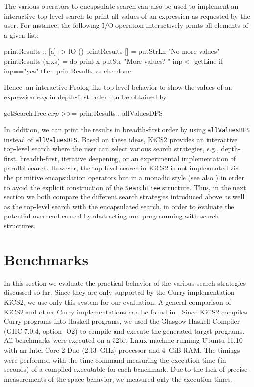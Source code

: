 \documentclass[english]{lni}
\newcommand{\code}[1]{\texttt{\small{}#1}}
\begin{document}
The various operators to encapsulate search can also
be used to implement an interactive top-level search
to print all values of an expression as requested by the user.
For instance, the following I/O operation interactively 
prints all elements of a given list:
%
\begin{curry}
printResults :: [a] -> IO ()
printResults []     = putStrLn "No more values"
printResults (x:xs) = do print x
                         putStr "More values? "
                         inp <- getLine
                         if inp=="yes" then printResults xs
                                       else done
\end{curry}
%
Hence, an interactive Prolog-like top-level behavior
to show the values of an expression $exp$ in depth-first order
can be obtained by
\begin{curry}
getSearchTree $exp$ >>= printResults . allValuesDFS
\end{curry}
In addition, we can print the results in breadth-first order
by using \code{allValuesBFS} instead of \code{allValuesDFS}.
Based on these ideas, KiCS2 provides an interactive top-level search
where the user can select various search strategies,
e.g., depth-first, breadth-first, iterative deepening, or
an experimental implementation of parallel search.
However, the top-level search in KiCS2 is not implemented
via the primitive encapsulation operators but in
a monadic style (see also \cite{BrasselHanusPeemoellerReck11})
in order to avoid the explicit construction
of the \code{SearchTree} structure.
Thus, in the next section we both compare the different search strategies
introduced above as well as the top-level search
with the encapsulated search, in order to evaluate the potential overhead
caused by abstracting and programming with search structures.


\section{Benchmarks}
\label{sec:benchmarks}

In this section we evaluate the practical behavior
of the various search strategies discussed so far.
Since they are only supported by the Curry implementation KiCS2,
we use only this system for our evaluation.
A general comparison of KiCS2 and other Curry implementations
can be found in \cite{BrasselHanusPeemoellerReck11}.
Since KiCS2 compiles Curry programs into Haskell programs,
we used the Glasgow Haskell Compiler
(GHC 7.0.4, option -O2) to compile and execute
the generated target programs.
All benchmarks were executed on a 32bit Linux machine
running Ubuntu 11.10 with an Intel Core 2 Duo (2.13~GHz) processor and 4~GiB RAM.
The timings were performed with the time command measuring the
execution time (in seconds) of a compiled executable for each benchmark.
Due to the lack of precise measurements of the space behavior,
we measured only the execution times.
\end{document}
